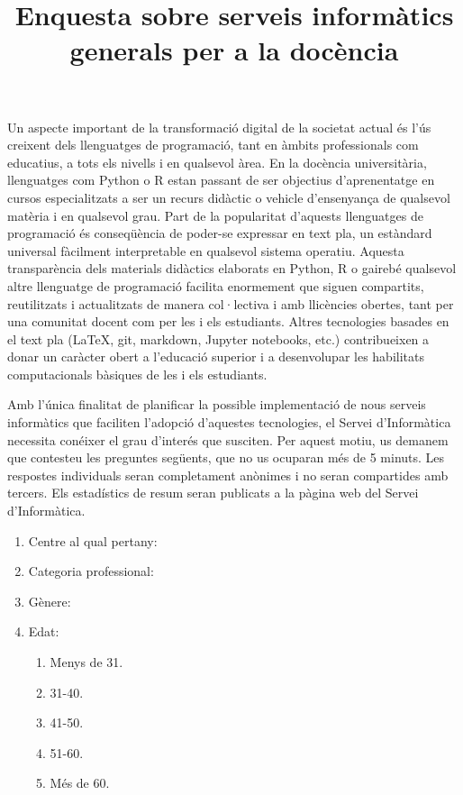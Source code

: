 \documentclass[a4paper,12pt]{article}
\title{Enquesta sobre serveis informàtics generals per a la docència}
\begin{document}
\maketitle
Un aspecte important de la transformació digital de la societat actual és l'ús creixent
dels llenguatges de programació, tant en àmbits professionals com educatius, a tots els
nivells i en qualsevol àrea. En la docència universitària, llenguatges com Python o R
estan passant de ser objectius d'aprenentatge en cursos especialitzats a ser un recurs
didàctic o vehicle d'ensenyança de qualsevol matèria i en qualsevol grau. Part de la
popularitat d'aquests llenguatges
de programació és conseqüència de poder-se expressar en text pla, un estàndard
universal fàcilment interpretable en qualsevol sistema operatiu. Aquesta
transparència dels materials didàctics elaborats en Python, R o gairebé qualsevol altre
llenguatge de programació facilita enormement que siguen compartits, reutilitzats i
actualitzats de manera col·lectiva i amb llicències obertes, tant per una comunitat docent
com per les i els estudiants. Altres tecnologies basades en el text pla (\LaTeX, git,
markdown, Jupyter notebooks, etc.) contribueixen a donar un caràcter obert a l'educació superior
i a desenvolupar les habilitats computacionals bàsiques de les i els estudiants.

Amb l'única finalitat de planificar la possible implementació de nous serveis informàtics que
faciliten l'adopció d'aquestes tecnologies, el Servei d'Informàtica necessita conéixer el
grau d'interés que susciten. Per aquest motiu, us demanem que contesteu les preguntes següents,
que no us ocuparan més de 5 minuts. Les respostes individuals seran completament anònimes i no seran
compartides amb tercers. Els estadístics de resum seran publicats a la pàgina web del Servei
d'Informàtica. 

\begin{enumerate}
\item Centre al qual pertany:
\item Categoria professional:
\item Gènere:
\item Edat:
   \begin{enumerate}
   \item Menys de 31.
   \item 31-40.
   \item 41-50.
   \item 51-60.
   \item Més de 60.
   \end{enumerate}
\end{enumerate}
\end{document}
